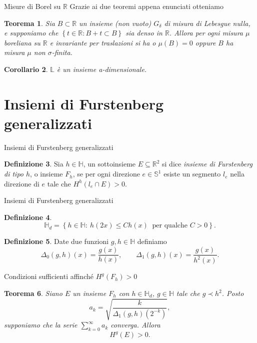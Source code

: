 \documentclass[intlimits]{beamer}
\numberwithin{equation}{section}
\theoremstyle{plain}
\newtheorem{teor}{Teorema}[section]
\newtheorem{cor}[teor]{Corollario}
\theoremstyle{definition}
\newtheorem{defin}[teor]{Definizione}
\theoremstyle{remark}
\newcommand{\gra}[1]{\left\{#1\right\}}
\renewcommand{\leq}{\leqslant}
\begin{document}
\begin{frame}{Misure di Borel su $\mathbb{R}$}
Grazie ai due teoremi appena enunciati otteniamo
\begin{teor}Sia $B\subset \mathbb{R}$ un insieme (non vuoto) $G_\delta$ di misura di Lebesgue nulla,
e supponiamo che $\gra{t \in \mathbb{R}: B+t \subset B}$ sia denso in $\mathbb{R}$. \pause Allora per ogni misura 
$\mu$ boreliana su $\mathbb{R}$ e invariante per traslazioni si ha \pause o $\mu(B)=0$ 
oppure $B$ ha misura $\mu$ non $\sigma$-finita.\end{teor}
\bigskip
\pause
\begin{cor}$\mathbb{L}$ è un insieme a-dimensionale.\end{cor}
\end{frame}





\section{Insiemi di Furstenberg generalizzati}
\begin{frame}{Insiemi di Furstenberg generalizzati}
\begin{defin} Sia $h \in \mathbb{H}$, un sottoinsieme $E\subseteq \mathbb{R}^2$ si dice \textit{insieme di Furstenberg di 
tipo $h$}, o insieme $F_h$, se per ogni direzione $e \in \mathbb{S}^1$ esiste un segmento $l_e$ nella 
direzione di $e$ tale che $H^h(l_e \cap E) >0$.\end{defin}
\end{frame}


\begin{frame}{Insiemi di Furstenberg generalizzati}
\begin{defin} \[\mathbb{H}_d = \gra{h \in \mathbb{H}: \ h(2x)\leq Ch(x) \ \text{ per qualche } C>0}.\] \end{defin}\pause
\begin{defin} Date due funzioni $g,h \in \mathbb{H}$ definiamo
\[ \Delta_0(g,h)(x)=\frac{g(x)}{h(x)}, \qquad \Delta_1(g,h)(x)=\frac{g(x)}{h^2(x)}.\] \end{defin}
\end{frame}


\begin{frame}{Condizioni sufficienti affinché $H^g(F_h)>0$}
\begin{teor} Siano $E$ un insieme $F_h$ con $h \in \mathbb{H}_d$, $g \in \mathbb{H}$ tale che $g \prec h^2$. \pause Posto
\[a_k= \sqrt{\frac{k}{\Delta_1(g,h)(2^{-k})}},\] supponiamo che la serie $\sum_{k=0}^\infty a_k$ converga. \pause
 Allora \[H^g(E)>0.\]
\end{teor}
\end{frame}
\end{document}
